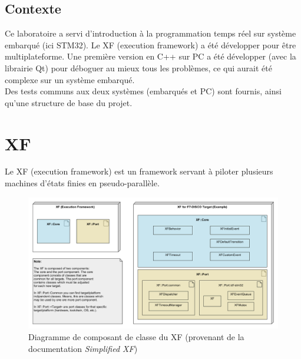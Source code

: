 \begin{summary}
\section{Contexte}
Ce laboratoire a servi d'introduction à la programmation temps réel sur
système embarqué (ici STM32).
Le XF (execution framework) a été développer pour être multiplateforme.
Une première version en C++ sur PC a été développer (avec la librairie Qt) pour 
déboguer au mieux tous les problèmes, ce qui aurait été complexe sur un système
embarqué.\\
Des tests communs aux deux systèmes (embarqués et PC) sont fournis, ainsi qu'une
structure de base du projet.
\end{summary}

\section{XF}
Le XF (execution framework) est un framework servant à piloter plusieurs machines
d'états finies en pseudo-parallèle.
\begin{figure}[H]
    \centering
        \includegraphics[width=\textwidth]{Images/xf/comp-simple-xf.png}
        \caption[Diagramme de composant de classe du XF]{Diagramme de composant de classe du XF 
        (provenant de la documentation \emph{Simplified XF}\footnotemark)}
\end{figure}

